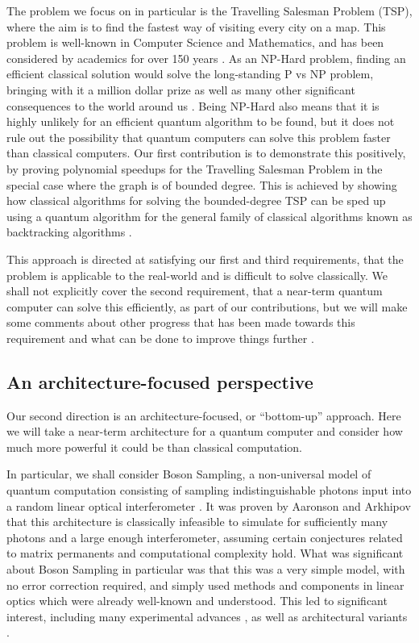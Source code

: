The problem we focus on in particular is the Travelling Salesman Problem (TSP), where the aim is to find the fastest way of visiting every city on a map. This problem is well-known in Computer Science and Mathematics, and has been considered by academics for over 150 years \cite{schrijver2005}. As an NP-Hard problem, finding an efficient classical solution would solve the long-standing P vs NP problem, bringing with it a million dollar prize as well as many other significant consequences to the world around us \cite{cmipvsnp, aaronson2006}. Being NP-Hard also means that it is highly unlikely for an efficient quantum algorithm to be found, but it does not rule out the possibility that quantum computers can solve this problem faster than classical computers. Our first contribution is to demonstrate this positively, by proving polynomial speedups for the Travelling Salesman Problem in the special case where the graph is of bounded degree. This is achieved by showing how classical algorithms for solving the bounded-degree TSP \cite{eppstein2007, xiao2016degree3, xiao2016degree4} can be sped up using a quantum algorithm for the general family of classical algorithms known as backtracking algorithms \cite{montanaro2015}.

This approach is directed at satisfying our first and third requirements, that the problem is applicable to the real-world and is difficult to solve classically. We shall not explicitly cover the second requirement, that a near-term quantum computer can solve this efficiently, as part of our contributions, but we will make some comments about other progress that has been made towards this requirement and what can be done to improve things further \cite{dunjko2018, ge2019}.

\subsection{An architecture-focused perspective}

Our second direction is an architecture-focused, or ``bottom-up'' approach. Here we will take a near-term architecture for a quantum computer and consider how much more powerful it could be than classical computation.

In particular, we shall consider Boson Sampling, a non-universal model of quantum computation consisting of sampling indistinguishable photons input into a random linear optical interferometer \cite{aaronson2010report, aaronson2011}. It was proven by Aaronson and Arkhipov that this architecture is classically infeasible to simulate for sufficiently many photons and a large enough interferometer, assuming certain conjectures related to matrix permanents and computational complexity hold. What was significant about Boson Sampling in particular was that this was a very simple model, with no error correction required, and simply used methods and components in linear optics which were already well-known and understood. This led to significant interest, including many experimental advances \cite{broome2013, spring2013, tillmann2013, crespi2013, carolan2015, wang2017, paesani2018, wang2019}, as well as architectural variants \cite{aaronson2013, lund2014, hamilton2017}.

